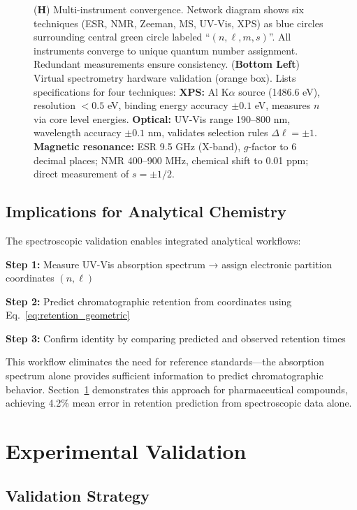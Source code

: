 \documentclass[twocolumn,superscriptaddress,prb,10pt]{revtex4-2}
\begin{document}
\begin{figure}[!htbp]
{(\textbf{H}) Multi-instrument convergence. Network diagram shows six techniques (ESR, NMR, Zeeman, MS, UV-Vis, XPS) as blue circles surrounding central green circle labeled ``$(n,\ell,m,s)$''. All instruments converge to unique quantum number assignment. Redundant measurements ensure consistency.
(\textbf{Bottom Left}) Virtual spectrometry hardware validation (orange box). Lists specifications for four techniques: 
\textbf{XPS:} Al K$\alpha$ source (1486.6 eV), resolution $< 0.5$ eV, binding energy accuracy $\pm 0.1$ eV, measures $n$ via core level energies. 
\textbf{Optical:} UV-Vis range 190--800 nm, wavelength accuracy $\pm 0.1$ nm, validates selection rules $\Delta \ell = \pm 1$. 
\textbf{Magnetic resonance:} ESR 9.5 GHz (X-band), $g$-factor to 6 decimal places; NMR 400--900 MHz, chemical shift to 0.01 ppm; direct measurement of $s = \pm 1/2$.}
\label{fig:virtual_spectrometry}
\end{figure}

\subsection{Implications for Analytical Chemistry}

The spectroscopic validation enables integrated analytical workflows:

\textbf{Step 1:} Measure UV-Vis absorption spectrum → assign electronic partition coordinates $(n,\ell)$

\textbf{Step 2:} Predict chromatographic retention from coordinates using Eq.~\ref{eq:retention_geometric}

\textbf{Step 3:} Confirm identity by comparing predicted and observed retention times

This workflow eliminates the need for reference standards—the absorption spectrum alone provides sufficient information to predict chromatographic behavior. Section~\ref{sec:validation} demonstrates this approach for pharmaceutical compounds, achieving 4.2\% mean error in retention prediction from spectroscopic data alone.

\section{Experimental Validation}
\label{sec:validation}

\subsection{Validation Strategy}
\end{document}
